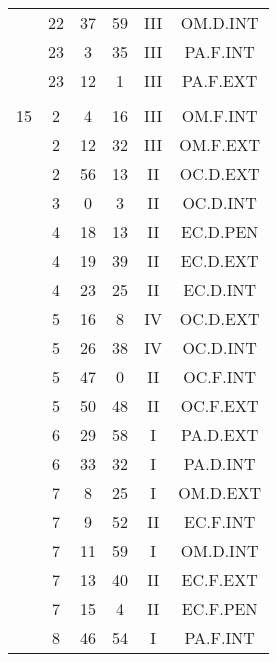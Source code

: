 \documentclass[12pt, a4paper]{article}
\begin{document}
\begin{multicols}{3}
{\begin{tabular}{c c c c c c}
	 	 	 	 & 22 & 37 & 59 & III & OM.D.INT\\%
	 	 	 	 & 23 & 3 & 35 & III & PA.F.INT\\%
	 	 	 	 & 23 & 12 & 1 & III & PA.F.EXT\\%
	 	 	 	 & & & & & \\%
	 	 	 	15 & 2 & 4 & 16 & III & OM.F.INT\\%
	 	 	 	 & 2 & 12 & 32 & III & OM.F.EXT\\%
	 	 	 	 & 2 & 56 & 13 & II & OC.D.EXT\\%
	 	 	 	 & 3 & 0 & 3 & II & OC.D.INT\\%
	 	 	 	 & 4 & 18 & 13 & II & EC.D.PEN\\%
	 	 	 	 & 4 & 19 & 39 & II & EC.D.EXT\\%
	 	 	 	 & 4 & 23 & 25 & II & EC.D.INT\\%
	 	 	 	 & 5 & 16 & 8 & IV & OC.D.EXT\\%
	 	 	 	 & 5 & 26 & 38 & IV & OC.D.INT\\%
	 	 	 	 & 5 & 47 & 0 & II & OC.F.INT\\%
	 	 	 	 & 5 & 50 & 48 & II & OC.F.EXT\\%
	 	 	 	 & 6 & 29 & 58 & I & PA.D.EXT\\%
	 	 	 	 & 6 & 33 & 32 & I & PA.D.INT\\%
	 	 	 	 & 7 & 8 & 25 & I & OM.D.EXT\\%
	 	 	 	 & 7 & 9 & 52 & II & EC.F.INT\\%
	 	 	 	 & 7 & 11 & 59 & I & OM.D.INT\\%
	 	 	 	 & 7 & 13 & 40 & II & EC.F.EXT\\%
	 	 	 	 & 7 & 15 & 4 & II & EC.F.PEN\\%
	 	 	 	 & 8 & 46 & 54 & I & PA.F.INT\\%

\end{tabular}}
\end{multicols}
\end{document}

